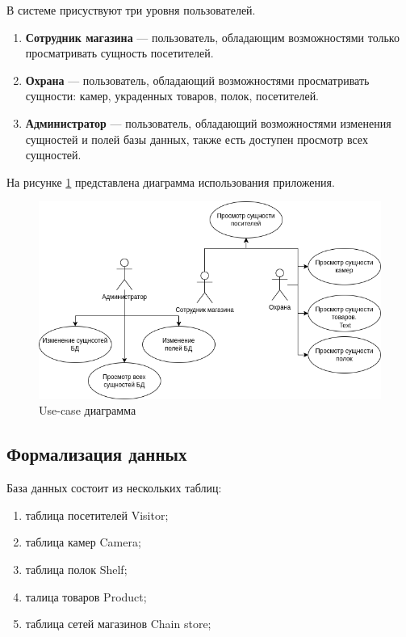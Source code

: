 В системе присуствуют три уровня пользователей.

\begin{enumerate}[label=\arabic*.]
    \item \textbf{Сотрудник магазина} --- пользователь, обладающим возможностями только просматривать
    сущность посетителей.
	\item \textbf{Охрана} --- пользователь, обладающий возможностями просматривать сущности: камер,
	украденных товаров, полок, посетителей.
	\item \textbf{Администратор} --- пользователь, обладающий возможностями изменения сущностей и полей
	базы данных, также есть доступен просмотр всех сущностей.
\end{enumerate}

На рисунке \ref{fig:anal:use-case} представлена диаграмма использования приложения.

\begin{figure}[ht!]
	\centering
	\includegraphics[width=0.7\linewidth]{assets/images/Use-case.drawio.png}
	\caption{Use-case диаграмма}
	\label{fig:anal:use-case}
\end{figure}
\FloatBarrier

\subsection{Формализация данных}

База данных состоит из нескольких таблиц:

\begin{enumerate}[label=\arabic*.]
	\item таблица посетителей Visitor;
	\item таблица камер Camera;
	\item таблица полок Shelf;
	\item талица товаров Product;
	\item таблица сетей магазинов Chain store;
\end{enumerate}

